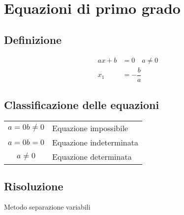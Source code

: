 \chapter{Equazioni di primo grado}
\section{Definizione}
\begin{align*}
ax+b&={}0\quad a\neq 0\\
x_1&=-\dfrac{b}{a}
\end{align*}
\section{Classificazione delle equazioni}
\begin{center}
	\begin{tabular}{cl}
		\toprule
		$a=0$\quad $b\neq 0$	& Equazione impossibile  \\ 
		$a=0$\quad $b=0$	& Equazione indeterminata\\ 
		$a\neq0$	& Equazione determinata  \\ 
		\bottomrule
	\end{tabular} 
\end{center}
\section{Risoluzione}
Metodo separazione variabili